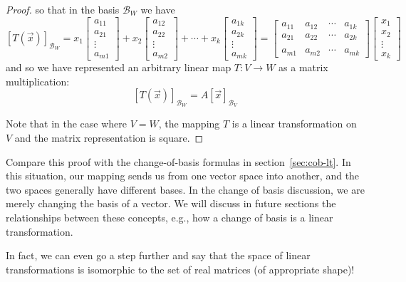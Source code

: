 \begin{proof}
so that in the basis $\mathcal{B}_W$ we have \[ \left[ T\left(\vec{x}\right)\right]_{\mathcal{B}_W} =  x_1 \left[ \begin{array}{c} a_{11} \\ a_{21} \\ \vdots \\ a_{m1} \end{array} \right] + x_2 \left[ \begin{array}{c} a_{12} \\ a_{22} \\ \vdots \\ a_{m2} \end{array} \right] + \cdots + x_k \left[ \begin{array}{c} a_{1k} \\ a_{2k} \\ \vdots \\ a_{mk} \end{array} \right] = \left[ \begin{array}{cccc} a_{11} & a_{12} & \cdots & a_{1k} \\ a_{21} & a_{22} & \cdots & a_{2k} \\ & & & \\ a_{m1} & a_{m2} & \cdots  & a_{mk}    \end{array}\right] \left[ \begin{array}{c} x_1 \\ x_2 \\ \vdots \\ x_k \end{array}\right] \]
and so we have represented an arbitrary linear map $T: V \rightarrow W$ as a matrix multiplication: \[ \left[ T\left(\vec{x}\right)\right]_{\mathcal{B}_W} = A \left[ \vec{x} \right]_{\mathcal{B}_V} \] 

Note that in the case where $V=W$, the mapping $T$ is a linear transformation on $V$ and the matrix representation is square.
\end{proof}

Compare this proof with the change-of-basis formulas in section~\ref{sec:cob-lt}. In this situation, our mapping sends us from one vector space into another, and the two spaces generally have different bases. In the change of basis discussion, we are merely changing the basis of a vector. We will discuss in future sections the relationships between these concepts, e.g., how a change of basis is a linear transformation.

In fact, we can even go a step further and say that the space of linear transformations is isomorphic to the set of real matrices (of appropriate shape)!





